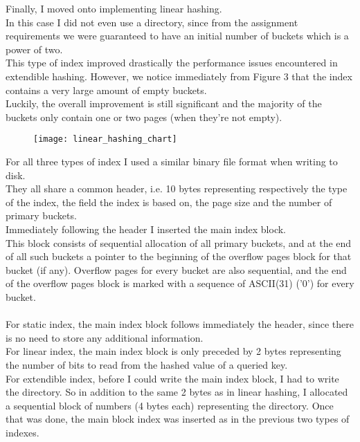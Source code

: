 \documentclass[12pt]{report}
\begin{document}
{\newpage

Finally, I moved onto implementing linear hashing. \\
In this case I did not even use a  directory, since from the assignment requirements we were guaranteed to have an initial number of buckets which is a power of two. \\
This type of index improved drastically the performance issues encountered in extendible hashing. However, we notice immediately from Figure 3 that the index contains a very large amount of empty buckets. \\
Luckily, the overall improvement is still significant and the majority of the buckets only contain one or two pages (when they're not empty).

\begin{figure}[!ht]
	\centering
	\texttt{[image: linear\_hashing\_chart]}
	\caption{}
	\centering
	\label{label:graph}
\end{figure}

\newpage

For all three types of index I used a similar binary file format when writing to disk. \\
They all share a common header, i.e. 10 bytes representing respectively the type of the index, the field the index is based on, the page size and the number of primary buckets. \\
Immediately following the header I inserted the main index block. \\
This block consists of sequential allocation of all primary buckets, and at the end of all such buckets a pointer to the beginning of the overflow pages block for that bucket (if any). Overflow pages for every bucket are also sequential, and the end of the overflow pages block is marked with a sequence of ASCII(31) ('0') for every bucket. \\ \\
For static index, the main index block follows immediately the header, since there is no need to store any additional information. \\
For linear index, the main index block is only preceded by 2 bytes representing the number of bits to read from the hashed value of a queried key. \\
For extendible index, before I could write the main index block, I had to write the directory. So in addition to the same 2 bytes as in linear hashing, I allocated a sequential block of numbers (4 bytes each) representing the directory. Once that was done, the main block index was inserted as in the previous two types of indexes.

}
\end{document}
